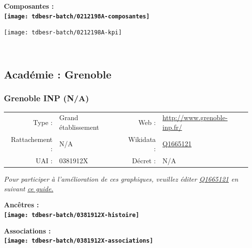 \documentclass[12pt,french,]{article}
\begin{document}
\begin{center} \bf Composantes : \\  
\texttt{[image: tdbesr-batch/0212198A-composantes]} \end{center}

\begin{center}\texttt{[image: tdbesr-batch/0212198A-kpi]} \end{center}\checkoddpage

\ifoddpage \fi ~\newpage  

\hypertarget{acaduxe9mie-grenoble-1}{%
\subsection{Académie : Grenoble}\label{acaduxe9mie-grenoble-1}}

\hypertarget{grenoble-inp-na}{%
\subsubsection{Grenoble INP (N/A)}\label{grenoble-inp-na}}

\begin{tabular*}{\textwidth}{rp{5cm}rl}  
\hline  
Type : & Grand établissement & Web : &\href{http://www.grenoble-inp.fr/}{http://www.grenoble-inp.fr/} \\  
Rattachement : & N/A & Wikidata : & \href{https://www.wikidata.org/entity/Q1665121}{Q1665121} \\  
UAI : & 0381912X & Décret : & N/A \\  
\hline  
\end{tabular*}

\textit{\scriptsize Pour participer à l'amélioration de ces graphiques, veuillez éditer  \href{https://www.wikidata.org/entity/Q1665121}{Q1665121}  en suivant \href{https://github.com/cpesr/wikidataESR/blob/master/Rmd/wikidataESR.md}{ce guide.}}

\vspace{1cm}  
\begin{minipage}[b]{0.50\textwidth}\begin{center} \bf Ancêtres : \\  
\texttt{[image: tdbesr-batch/0381912X-histoire]} \end{center}\end{minipage}\begin{minipage}[b]{0.50\textwidth}\begin{center} \bf Associations : \\  
\texttt{[image: tdbesr-batch/0381912X-associations]} \end{center}\end{minipage}
\end{document}
